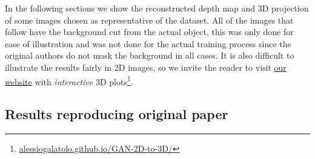 In the following sections we show the reconstructed depth map and 3D projection of some images chosen as representative of the dataset. All of the images that follow have the background cut from the actual object, this was only done for ease of illustration and was not done for the actual training process since the original authors do not mask the background in all cases. It is also difficult to illustrate the results fairly in 2D images, so we invite the reader to visit \href{https://alessiogalatolo.github.io/GAN-2D-to-3D/}{our website} 
with \textit{interactive} 3D plots\footnote{\href{https://alessiogalatolo.github.io/GAN-2D-to-3D/}{alessiogalatolo.github.io/GAN-2D-to-3D/}}.

\subsection{Results reproducing original paper}
\label{sec:replication}

